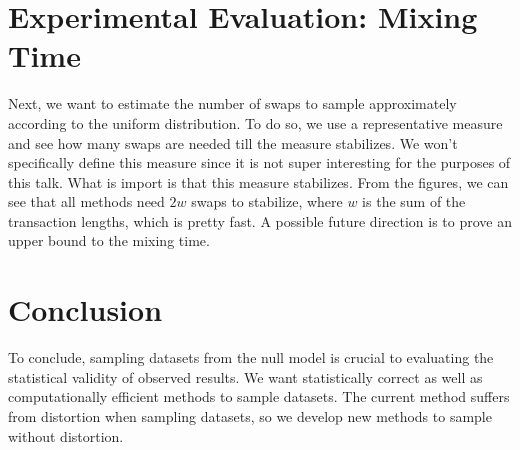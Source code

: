 \documentclass{article}
\begin{document}
\section*{Experimental Evaluation: Mixing Time}

Next, we want to estimate the number of swaps to sample approximately according
to the uniform distribution. To do so, we use a representative measure and see
how many swaps are needed till the measure stabilizes. We won't specifically
define this measure since it is not super interesting for the purposes of this
talk. What is import is that this measure stabilizes. From the figures, we can
see that all methods need $2w$ swaps to stabilize, where $w$ is the sum of the
transaction lengths, which is pretty fast. A possible future direction is to
prove an upper bound to the mixing time.

\section*{Conclusion}

To conclude, sampling datasets from the null model is crucial to evaluating the
statistical validity of observed results. We want statistically correct as well
as computationally efficient methods to sample datasets. The current method
suffers from distortion when sampling datasets, so we develop new methods to
sample without distortion.
\end{document}

